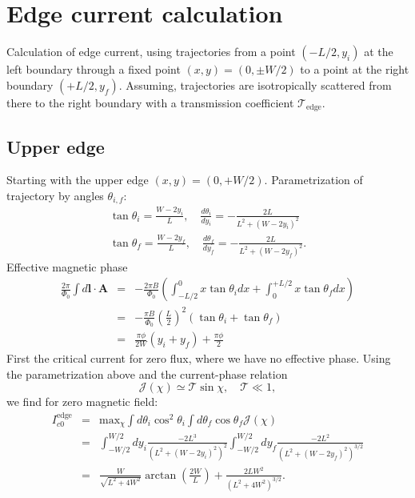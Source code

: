 \documentclass[a4paper]{article}
\begin{document}
\section{Edge current calculation}
Calculation of edge current, using trajectories from a point $(-L/2, y_i)$ at the left boundary through a fixed point $(x, y) = (0, \pm W/2)$ to a point at the right boundary $(+L/2, y_f)$. Assuming, trajectories are isotropically scattered from there to the right boundary with a transmission coefficient $\mathcal{T}_{\text{edge}}$.
\subsection{Upper edge}
Starting with the upper edge $(x, y) = (0, + W/2)$.
Parametrization of trajectory by angles $\theta_{i, f}$:
	\begin{eqnarray}
	\tan\theta_i = \frac{W - 2 y_i}{L}, \quad \frac{d \theta_i}{d y_i} = -\frac{2L}{L^2 + (W - 2y_i)^2}  \\
	\tan\theta_f =\frac{W - 2y_f}{L}, \quad  \frac{d \theta_f}{d y_f} = - \frac{2L}{L^2 + (W - 2 y_f)^2}.
	\end{eqnarray}	
Effective magnetic phase
	\begin{eqnarray}
	\frac{2\pi}{\Phi_0} \int d\mathbf{l} \cdot \mathbf{A}  &=& -\frac{2 \pi B}{\Phi_0} \left( \int_{-L/2}^{0} x \tan \theta_i dx + \int_{0}^{+L/2} x \tan \theta_f dx\right)\\
	&=& -\frac{\pi B}{\Phi_0} \left( \frac{L}{2}\right)^2 \left(\tan \theta_i + \tan \theta_f \right) \\
	&=& \frac{\pi \phi}{2 W} \left( y_i + y_f \right) + \frac{\pi \phi}{2} 
	\label{phase}
	\end{eqnarray}
First the critical current for zero flux, where we have no effective phase. Using the parametrization above and the current-phase relation
	\begin{equation}
	\mathcal{J}(\chi)\simeq  \mathcal{T} \sin\chi, \quad \mathcal{T}\ll 1,
	\label{sawT<1}
	\end{equation}
we find for zero magnetic field:
	\begin{eqnarray}
	I^{\text{edge}}_{c0} &=& \text{max}_{\chi} \int d \theta_i \cos^2 \theta_i\int d \theta_f \cos \theta_f \mathcal{J}(\chi)\\
	&=& \int_{-W/2}^{W/2} d y_i \frac{-2 L^3}{\left(L^2 + (W - 2y_i)^2\right)^2 }\int_{-W/2}^{W/2} dy_f \frac{-2 L^2}{\left(L^2 + (W - 2 y_f )^2 \right)^{3/2}}\\
	&=&  \frac{W}{\sqrt{L^2 + 4 W^2}} \arctan\left(\frac{2 W}{L} \right) + \frac{2 L W^2}{\left( L^2 + 4 W^2 \right)^{3/2}}.
	\label{ic0}
	\end{eqnarray}
\end{document}
